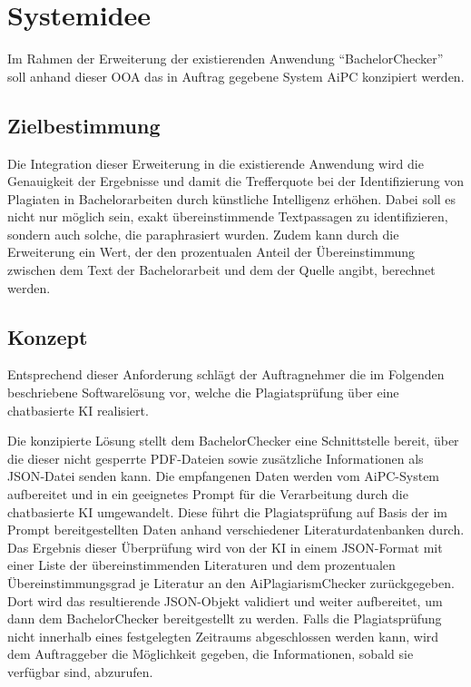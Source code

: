 \chapter{Systemidee}\label{ch:systemidee}

Im Rahmen der Erweiterung der existierenden Anwendung “BachelorChecker” soll anhand dieser \ac{OOA} das in Auftrag gegebene System \ac{AiPC} konzipiert werden.

\section{Zielbestimmung}\label{sec:zielbestimmung}

Die Integration dieser Erweiterung in die existierende Anwendung wird die Genauigkeit der Ergebnisse und damit die Trefferquote bei der Identifizierung von Plagiaten in Bachelorarbeiten durch künstliche Intelligenz erhöhen.
Dabei soll es nicht nur möglich sein, exakt übereinstimmende Textpassagen zu identifizieren, sondern auch solche, die paraphrasiert wurden.
Zudem kann durch die Erweiterung ein Wert, der den prozentualen Anteil der Übereinstimmung zwischen dem Text der Bachelorarbeit und dem der Quelle angibt, berechnet werden.

\section{Konzept}\label{sec:konzept}

Entsprechend dieser Anforderung schlägt der Auftragnehmer die im Folgenden beschriebene Softwarelösung vor, welche die Plagiatsprüfung über eine chatbasierte KI realisiert.

Die konzipierte Lösung stellt dem BachelorChecker eine Schnittstelle bereit, über die dieser nicht gesperrte \ac{PDF}-Dateien sowie zusätzliche Informationen als \ac{JSON}-Datei senden kann.
Die empfangenen Daten werden vom \ac{AiPC}-System aufbereitet und in ein geeignetes Prompt für die Verarbeitung durch die chatbasierte \ac{KI} umgewandelt.
Diese führt die Plagiatsprüfung auf Basis der im Prompt bereitgestellten Daten anhand verschiedener Literaturdatenbanken durch.
Das Ergebnis dieser Überprüfung wird von der \ac{KI} in einem JSON-Format mit einer Liste der übereinstimmenden Literaturen und dem prozentualen Übereinstimmungsgrad je Literatur an den AiPlagiarismChecker zurückgegeben.
Dort wird das resultierende \ac{JSON}-Objekt validiert und weiter aufbereitet, um dann dem BachelorChecker bereitgestellt zu werden.
Falls die Plagiatsprüfung nicht innerhalb eines festgelegten Zeitraums abgeschlossen werden kann, wird dem Auftraggeber die Möglichkeit gegeben, die Informationen, sobald sie verfügbar sind, abzurufen.


